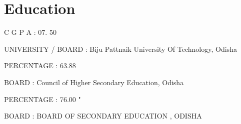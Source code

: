 \documentclass[]{deedy-resume-reversed}
\begin{document}
\begin{minipage}[t]{0.60\textwidth}
\section{Education}
\vspace{\topsep} %
\begin{tightemize}
\item C G P A : 07. 50
\item UNIVERSITY / BOARD : 
Biju Pattnaik University Of Technology, Odisha
\end{tightemize}
\sectionsep

\begin{tightemize}
\item PERCENTAGE : 63.88 %
\item BOARD : 
Council of Higher Secondary Education, Odisha


\end{tightemize}
\sectionsep

\begin{tightemize}
\item PERCENTAGE : 76.00 "%
\item BOARD : 
BOARD OF SECONDARY EDUCATION , ODISHA
\end{tightemize}
\sectionsep




\end{minipage}
\end{document}
